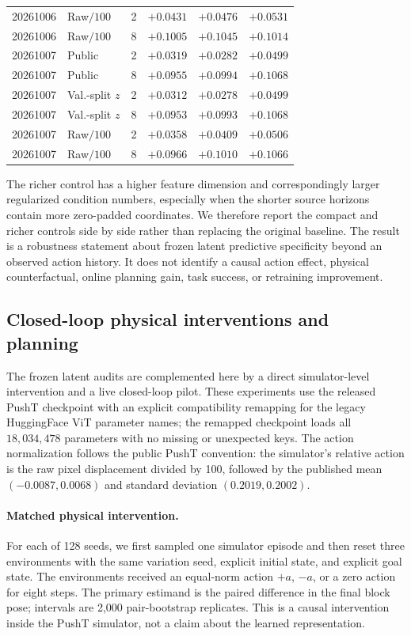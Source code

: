 \documentclass{article}
\begin{document}
\begin{table}[H]
{\begin{tabular}{llrrrr}
20261006 & Raw$/100$ & 2 & $+0.0431$ & $+0.0476$ & $+0.0531$ \\
20261006 & Raw$/100$ & 8 & $+0.1005$ & $+0.1045$ & $+0.1014$ \\
20261007 & Public & 2 & $+0.0319$ & $+0.0282$ & $+0.0499$ \\
20261007 & Public & 8 & $+0.0955$ & $+0.0994$ & $+0.1068$ \\
20261007 & Val.-split $z$ & 2 & $+0.0312$ & $+0.0278$ & $+0.0499$ \\
20261007 & Val.-split $z$ & 8 & $+0.0953$ & $+0.0993$ & $+0.1068$ \\
20261007 & Raw$/100$ & 2 & $+0.0358$ & $+0.0409$ & $+0.0506$ \\
20261007 & Raw$/100$ & 8 & $+0.0966$ & $+0.1010$ & $+0.1066$ \\
\bottomrule
\end{tabular}}
\end{table}

The richer control has a higher feature dimension and correspondingly larger
regularized condition numbers, especially when the shorter source horizons
contain more zero-padded coordinates. We therefore report the compact and
richer controls side by side rather than replacing the original baseline.
The result is a robustness statement about frozen latent predictive
specificity beyond an observed action history. It does not identify a causal
action effect, physical counterfactual, online planning gain, task success,
or retraining improvement.

\subsection{Closed-loop physical interventions and planning}
\label{sec:supp-closed-loop}

The frozen latent audits are complemented here by a direct simulator-level
intervention and a live closed-loop pilot.  These experiments use the released
PushT checkpoint with an explicit compatibility remapping for the legacy
HuggingFace ViT parameter names; the remapped checkpoint loads all
$18{,}034{,}478$ parameters with no missing or unexpected keys.  The action
normalization follows the public PushT convention: the simulator's relative
action is the raw pixel displacement divided by 100, followed by the
published mean $(-0.0087,0.0068)$ and standard deviation $(0.2019,0.2002)$.

\paragraph{Matched physical intervention.}
For each of 128 seeds, we first sampled one simulator episode and then reset
three environments with the same variation seed, explicit initial state, and
explicit goal state.  The environments received an equal-norm action $+a$,
$-a$, or a zero action for eight steps.  The primary estimand is the paired
difference in the final block pose; intervals are 2,000 pair-bootstrap
replicates.  This is a causal intervention inside the PushT simulator, not a
claim about the learned representation.
\end{document}
